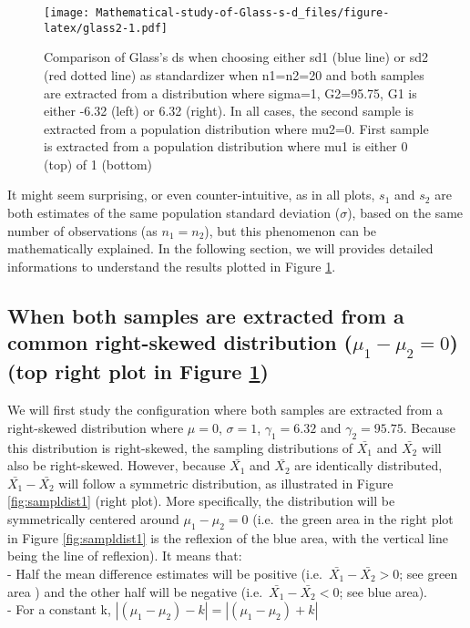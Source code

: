 \documentclass[
  man,floatsintext]{apa6}
\begin{document}
\begin{figure}
\centering
\texttt{[image: Mathematical-study-of-Glass-s-d\_files/figure-latex/glass2-1.pdf]}
\caption{\label{fig:glass2}Comparison of Glass's ds when choosing either sd1 (blue line) or sd2 (red dotted line) as standardizer when n1=n2=20 and both samples are extracted from a distribution where sigma=1, G2=95.75, G1 is either -6.32 (left) or 6.32 (right). In all cases, the second sample is extracted from a population distribution where mu2=0. First sample is extracted from a population distribution where mu1 is either 0 (top) of 1 (bottom)}
\end{figure}

It might seem surprising, or even counter-intuitive, as in all plots, \(s_1\) and \(s_2\) are both estimates of the same population standard deviation (\(\sigma\)), based on the same number of observations (as \(n_1=n_2\)), but this phenomenon can be mathematically explained. In the following section, we will provides detailed informations to understand the results plotted in Figure \ref{fig:glass2}.

\hypertarget{when-both-samples-are-extracted-from-a-common-right-skewed-distribution-mu_1-mu_20-top-right-plot-in-figure}{%
\subsection{\texorpdfstring{When both samples are extracted from a common right-skewed distribution (\textbf{\(\mu_1-\mu_2=0\)}) (top right plot in Figure \ref{fig:glass2})}{When both samples are extracted from a common right-skewed distribution (\textbackslash mu\_1-\textbackslash mu\_2=0) (top right plot in Figure )}}\label{when-both-samples-are-extracted-from-a-common-right-skewed-distribution-mu_1-mu_20-top-right-plot-in-figure}}

We will first study the configuration where both samples are extracted from a right-skewed distribution where \(\mu=0\), \(\sigma=1\), \(\gamma_1=6.32\) and \(\gamma_2=95.75\). Because this distribution is right-skewed, the sampling distributions of \(\bar{X_1}\) and \(\bar{X_2}\) will also be right-skewed. However, because \(\bar{X_1}\) and \(\bar{X_2}\) are identically distributed, \(\bar{X_1}-\bar{X_2}\) will follow a symmetric distribution, as illustrated in Figure \ref{fig:sampldist1} (right plot).
More specifically, the distribution will be symmetrically centered around \(\mu_1-\mu_2=0\) (i.e.~the green area in the right plot in Figure \ref{fig:sampldist1} is the reflexion of the blue area, with the vertical line being the line of reflexion). It means that:\\
- Half the mean difference estimates will be positive (i.e.~\(\bar{X_1}-\bar{X_2} > 0\); see green area ) and the other half will be negative (i.e.~\(\bar{X_1}-\bar{X_2} < 0\); see blue area).\\
- For a constant k, \(|(\mu_1-\mu_2)-k|=|(\mu_1-\mu_2)+k|\)
\end{document}
